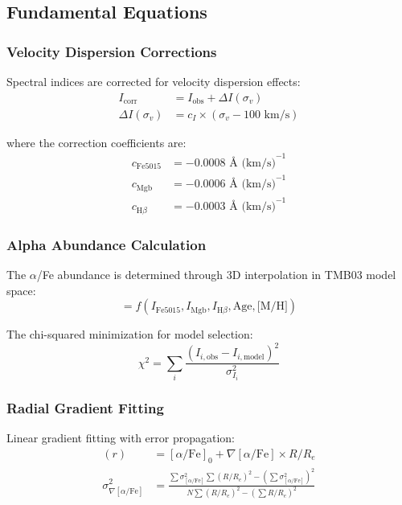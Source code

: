 \documentclass[12pt,a4paper]{article}
\newcommand{\alphaFe}{[\alpha/\text{Fe}]}
\newcommand{\RRe}{R/R_e}
\newcommand{\sigmaV}{\sigma_v}
\begin{document}
\subsection{Fundamental Equations}

\subsubsection{Velocity Dispersion Corrections}
Spectral indices are corrected for velocity dispersion effects:
\begin{align}
I_{\text{corr}} &= I_{\text{obs}} + \Delta I(\sigmaV) \\
\Delta I(\sigmaV) &= c_I \times (\sigmaV - 100 \text{ km/s})
\end{align}

where the correction coefficients are:
\begin{align}
c_{\text{Fe5015}} &= -0.0008 \text{ \AA\ (km/s)}^{-1} \\
c_{\text{Mgb}} &= -0.0006 \text{ \AA\ (km/s)}^{-1} \\
c_{\text{H}\beta} &= -0.0003 \text{ \AA\ (km/s)}^{-1}
\end{align}

\subsubsection{Alpha Abundance Calculation}
The $\alpha$/Fe abundance is determined through 3D interpolation in TMB03 model space:
\begin{equation}
\alphaFe = f(I_{\text{Fe5015}}, I_{\text{Mgb}}, I_{\text{H}\beta}, \text{Age}, \text{[M/H]})
\end{equation}

The chi-squared minimization for model selection:
\begin{equation}
\chi^2 = \sum_{i} \frac{(I_{i,\text{obs}} - I_{i,\text{model}})^2}{\sigma_{I_i}^2}
\end{equation}

\subsubsection{Radial Gradient Fitting}
Linear gradient fitting with error propagation:
\begin{align}
\alphaFe(r) &= \alphaFe_0 + \nabla\alphaFe \times \RRe \\
\sigma_{\nabla\alphaFe}^2 &= \frac{\sum \sigma_{\alphaFe}^2 \sum (\RRe)^2 - (\sum \sigma_{\alphaFe}^2)^2}{N \sum (\RRe)^2 - (\sum \RRe)^2}
\end{align}
\end{document}
